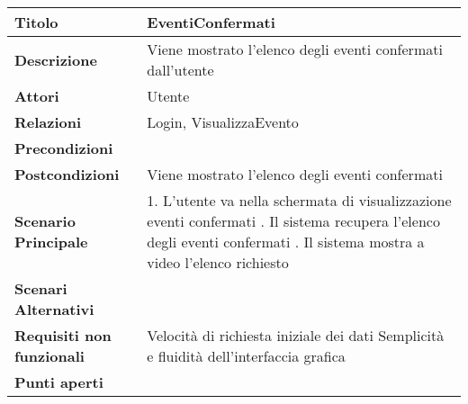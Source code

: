 \begin{tabular} {|P{4.5cm}|P{11cm}|}
  \hline
  \textbf{Titolo}                   & EventiConfermati                                            \\
  \hline
  \textbf{Descrizione}              & Viene mostrato l'elenco degli eventi confermati dall'utente \\
  \hline
  \textbf{Attori}                   & Utente                                                      \\
  \hline
  \textbf{Relazioni}                & Login, VisualizzaEvento                                     \\
  \hline
  \textbf{Precondizioni}            &                                                             \\
  \hline
  \textbf{Postcondizioni}           & Viene mostrato l'elenco degli eventi confermati             \\
  \hline
  \textbf{Scenario Principale}      & 1. L'utente va nella schermata di
  visualizzazione eventi confermati . Il sistema recupera l'elenco degli eventi confermati . Il sistema mostra a video
  l'elenco richiesto                                                                              \\
  \hline
  \textbf{Scenari Alternativi}      &                                                             \\
  \hline
  \textbf{Requisiti non funzionali} & Velocità di richiesta iniziale dei dati\linebreak
  Semplicità e fluidità dell'interfaccia grafica                                                  \\
  \hline
  \textbf{Punti aperti}             &                                                             \\
  \hline
\end{tabular}
\hfill
\break


